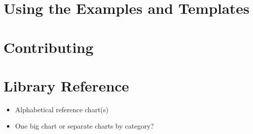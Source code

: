 \documentclass{OLLbook}
\begin{document}
\chapter{Using the Examples and Templates}



\chapter{Contributing}



\chapter{Library Reference}
\begin{itemize}
\item Alphabetical reference chart(s)
\item One big chart or separate charts by category?
\end{itemize}
\end{document}
